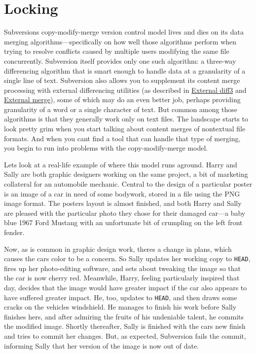 \section{Locking}\label{svn.advanced.locking}

Subversion\textquotesingle s copy-modify-merge version control model
lives and dies on its data merging algorithms---specifically on how well
those algorithms perform when trying to resolve conflicts caused by
multiple users modifying the same file concurrently. Subversion itself
provides only one such algorithm: a three-way differencing algorithm
that is smart enough to handle data at a granularity of a single line of
text. Subversion also allows you to supplement its content merge
processing with external differencing utilities (as described in
\hyperref[svn.advanced.externaldifftools.diff3]{External diff3} and
\hyperref[svn.advanced.externaldifftools.merge]{External merge}), some
of which may do an even better job, perhaps providing granularity of a
word or a single character of text. But common among those algorithms is
that they generally work only on text files. The landscape starts to
look pretty grim when you start talking about content merges of
nontextual file formats. And when you can\textquotesingle t find a tool
that can handle that type of merging, you begin to run into problems
with the copy-modify-merge model.

Let\textquotesingle s look at a real-life example of where this model
runs aground. Harry and Sally are both graphic designers working on the
same project, a bit of marketing collateral for an automobile mechanic.
Central to the design of a particular poster is an image of a car in
need of some bodywork, stored in a file using the PNG image format. The
poster\textquotesingle s layout is almost finished, and both Harry and
Sally are pleased with the particular photo they chose for their damaged
car---a baby blue 1967 Ford Mustang with an unfortunate bit of crumpling
on the left front fender.

Now, as is common in graphic design work, there\textquotesingle s a
change in plans, which causes the car\textquotesingle s color to be a
concern. So Sally updates her working copy to \texttt{HEAD}, fires up
her photo-editing software, and sets about tweaking the image so that
the car is now cherry red. Meanwhile, Harry, feeling particularly
inspired that day, decides that the image would have greater impact if
the car also appears to have suffered greater impact. He, too, updates
to \texttt{HEAD}, and then draws some cracks on the
vehicle\textquotesingle s windshield. He manages to finish his work
before Sally finishes hers, and after admiring the fruits of his
undeniable talent, he commits the modified image. Shortly thereafter,
Sally is finished with the car\textquotesingle s new finish and tries to
commit her changes. But, as expected, Subversion fails the commit,
informing Sally that her version of the image is now out of date.

